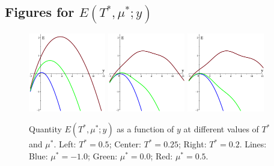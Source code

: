 \documentclass[12pt]{article}
\numberwithin{equation}{section}
\begin{document}
	\subsection{Figures for $E(T^*,\mu^*;y)$}
	\label{sec:figE0}
	
	\begin{figure}[htbp]
		\includegraphics[width=0.3\textwidth,angle=0]{images/E0y_vs_y_a1}
		\hfill
		\includegraphics[width=0.3\textwidth,angle=0]{images/E0y_vs_y_a2}
		\hfill
		\includegraphics[width=0.3\textwidth,angle=0]{images/E0y_vs_y_a3}
		\\
		\vfill
		\parbox{0.95\textwidth}{\caption{\label{fig:E0y_vs_y_a} Quantity $E(T^*,\mu^*;y)$ as a function of $y$ at different values of $T^*$ and $\mu^*$. Left: $T^*=0.5$; Center: $T^*=0.25$; Right: $T^*=0.2$. Lines: Blue: $\mu^*=-1.0$; Green: $\mu^*=0.0$; Red: $\mu^*=0.5$.}}
		
	\end{figure}
	
\end{document}
